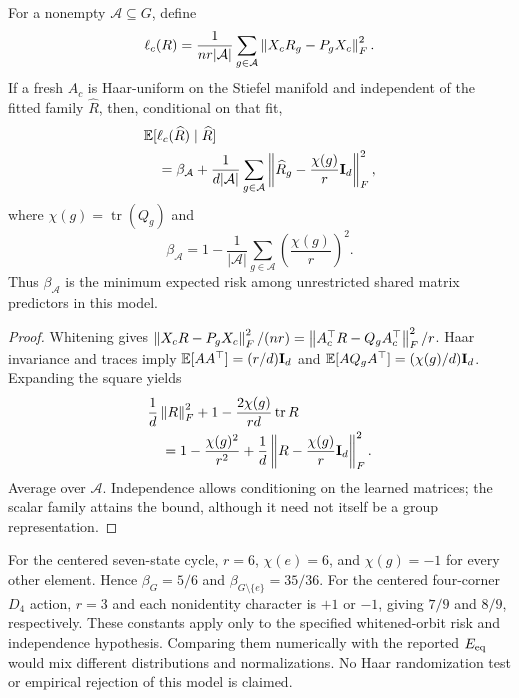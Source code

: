 \begin{proposition}
\label{prop:orientation}
For a nonempty $\mathcal A\subseteq G$, define
\[
 \ell_c(R)=\frac{1}{nr|\mathcal A|}\sum_{g\in\mathcal A}\left\lVert X_cR_g-P_gX_c\right\rVert_F^2.
\]
If a fresh $A_c$ is Haar-uniform on the Stiefel manifold and independent of the fitted family $\widehat R$, then, conditional on that fit,
\begin{equation}
\begin{aligned}
 &\mathbb E[\ell_c(\widehat R)\mid\widehat R]\\
 &\quad=\beta_{\mathcal A}+\frac{1}{d|\mathcal A|}\sum_{g\in\mathcal A}
 \left\lVert \widehat R_g-\frac{\chi(g)}r\mathbf{I}_d\right\rVert_F^2,
\end{aligned}
\end{equation}
where $\chi(g)=\operatorname{tr}(Q_g)$ and
\[
 \beta_{\mathcal A}=1-\frac1{|\mathcal A|}\sum_{g\in\mathcal A}\left(\frac{\chi(g)}r\right)^2.
\]
Thus $\beta_{\mathcal A}$ is the minimum expected risk among unrestricted shared matrix predictors in this model.
\end{proposition}
\begin{proof}
Whitening gives $\left\lVert X_cR-P_gX_c\right\rVert_F^2/(nr)=\left\lVert A_c^\top R-Q_gA_c^\top\right\rVert_F^2/r$. Haar invariance and traces imply $\mathbb E[AA^\top]=(r/d)\mathbf{I}_d$ and $\mathbb E[AQ_gA^\top]=(\chi(g)/d)\mathbf{I}_d$. Expanding the square yields
\begin{align*}
 &\frac1d\left\lVert R\right\rVert_F^2+1-\frac{2\chi(g)}{rd}\operatorname{tr}R\\
 &\quad=1-\frac{\chi(g)^2}{r^2}
   +\frac1d\left\lVert R-\frac{\chi(g)}r\mathbf{I}_d\right\rVert_F^2.
\end{align*}
Average over $\mathcal A$. Independence allows conditioning on the learned matrices; the scalar family attains the bound, although it need not itself be a group representation.
\end{proof}
For the centered seven-state cycle, $r=6$, $\chi(e)=6$, and $\chi(g)=-1$ for every other element. Hence $\beta_G=5/6$ and $\beta_{G\setminus\{e\}}=35/36$. For the centered four-corner $D_4$ action, $r=3$ and each nonidentity character is $+1$ or $-1$, giving $7/9$ and $8/9$, respectively. These constants apply only to the specified whitened-orbit risk and independence hypothesis. Comparing them numerically with the reported $E_{\mathrm{eq}}$ would mix different distributions and normalizations. No Haar randomization test or empirical rejection of this model is claimed.

